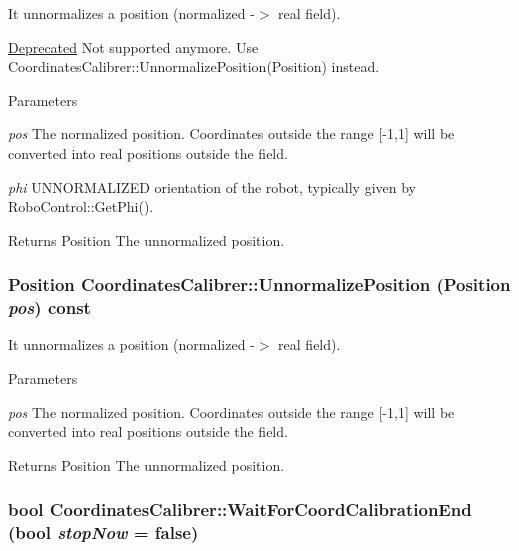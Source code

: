 It unnormalizes a position (normalized -\/$>$ real field). 

\begin{Desc}
\item[\hyperlink{deprecated__deprecated000002}{Deprecated}]Not supported anymore. Use CoordinatesCalibrer::UnnormalizePosition(Position) instead.\end{Desc}

\begin{DoxyParams}{Parameters}
\item[{\em pos}]The normalized position. Coordinates outside the range \mbox{[}-\/1,1\mbox{]} will be converted into real positions outside the field. \item[{\em phi}]UNNORMALIZED orientation of the robot, typically given by RoboControl::GetPhi(). \end{DoxyParams}
\begin{DoxyReturn}{Returns}
Position The unnormalized position. 
\end{DoxyReturn}
\hypertarget{classCoordinatesCalibrer_a8522193b13196313d001c589e7845bd3}{
\subsubsection[{UnnormalizePosition}]{\setlength{\rightskip}{0pt plus 5cm}Position CoordinatesCalibrer::UnnormalizePosition (Position {\em pos}) const}}
\label{classCoordinatesCalibrer_a8522193b13196313d001c589e7845bd3}


It unnormalizes a position (normalized -\/$>$ real field). 


\begin{DoxyParams}{Parameters}
\item[{\em pos}]The normalized position. Coordinates outside the range \mbox{[}-\/1,1\mbox{]} will be converted into real positions outside the field. \end{DoxyParams}
\begin{DoxyReturn}{Returns}
Position The unnormalized position. 
\end{DoxyReturn}
\hypertarget{classCoordinatesCalibrer_a99563ba6e43f839bf1b10f55cf155125}{
\subsubsection[{WaitForCoordCalibrationEnd}]{\setlength{\rightskip}{0pt plus 5cm}bool CoordinatesCalibrer::WaitForCoordCalibrationEnd (bool {\em stopNow} = {\ttfamily false})}}
\label{classCoordinatesCalibrer_a99563ba6e43f839bf1b10f55cf155125}


